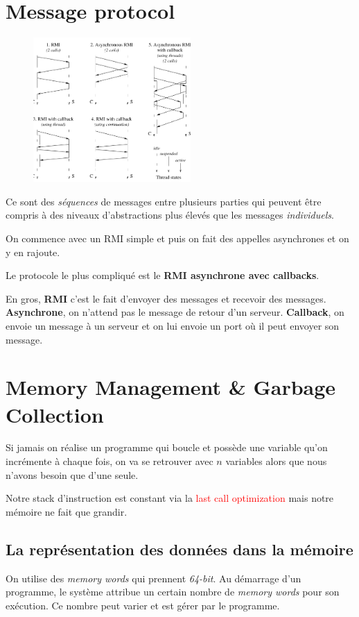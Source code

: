 \documentclass{report}
\begin{document}
\section{Message protocol}
\begin{figure}
\centering
\includegraphics[width=6cm]{img/message.png}
\end{figure}
Ce sont des \textit{séquences} de messages entre plusieurs parties qui peuvent être compris à des niveaux d'abstractions plus élevés que les messages \textit{individuels}.\par 
On commence avec un RMI simple et puis on fait des appelles asynchrones et on y en rajoute. \par 
Le protocole le plus compliqué est le \textbf{RMI asynchrone avec callbacks}.\par
En gros, \textbf{RMI} c'est le fait d'envoyer des messages et recevoir des messages. \textbf{Asynchrone}, on n'attend pas le message de retour d'un serveur. \textbf{Callback}, on envoie un message à un serveur et on lui envoie un port où il peut envoyer son message.

\section{Memory Management \& Garbage Collection}

Si jamais on réalise un programme qui boucle et possède une variable qu'on incrémente à chaque fois, on va se retrouver avec $n$ variables alors que nous n'avons besoin que d'une seule.\par 
Notre stack d'instruction est constant via la \textcolor{red}{last call optimization} mais notre mémoire ne fait que grandir.

\subsection{La représentation des données dans la mémoire}
On utilise des \textit{memory words} qui prennent \textit{64-bit}. Au démarrage d'un programme, le système attribue un certain nombre de \textit{memory words} pour son exécution. Ce nombre peut varier et est gérer par le programme.
\end{document}
